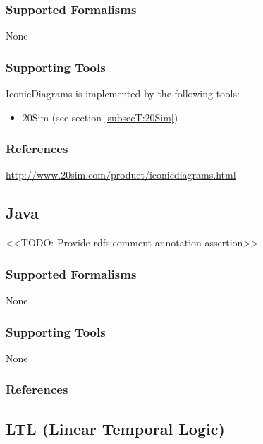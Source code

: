 \subsubsection{Supported Formalisms}

None


\subsubsection{Supporting Tools}

IconicDiagrams is implemented by the following tools:
\begin{itemize}
	\item 20Sim (see section \ref{subsecT:20Sim})
\end{itemize}


\subsubsection{References}

\url{http://www.20sim.com/product/iconicdiagrams.html}



\subsection{Java}
\label{subsecL:Java}


<<TODO: Provide rdfs:comment annotation assertion>>

\subsubsection{Supported Formalisms}

None


\subsubsection{Supporting Tools}

None


\subsubsection{References}





\subsection{LTL (Linear Temporal Logic)}
\label{subsecL:LTL}

